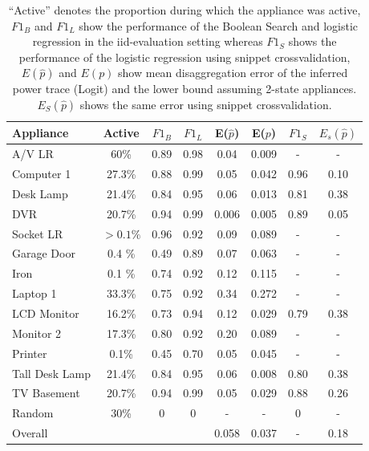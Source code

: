 \begin{table}[]
\setlength{\tabcolsep}{1pt}
\centering
\begin{tabular}{l|c|c|c|c|c || c | c}
\hline
Appliance      & Active            & $F1_{B}$ & $F1_{L}$ & E($\hat{p}$) & E($p$) & $F1_{S}$ & $E_s(\hat{p})$ \\ \hline
A/V LR         & 60\%              & 0.89        & 0.98       & 0.04      & 0.009  & - & -\\
Computer 1     & 27.3\%            & 0.88        & 0.99       & 0.05      & 0.042 & 0.96 & 0.10  \\
Desk Lamp      & 21.4\%            & 0.84        & 0.95       & 0.06      & 0.013 & 0.81 & 0.38  \\
DVR            & 20.7\%            & 0.94          & 0.99       & 0.006      & 0.005 & 0.89 & 0.05  \\
Socket LR      & $>0.1\%$ & 0.96        & 0.92       & 0.09      & 0.089 & - & -  \\
Garage Door    & 0.4 \%            & 0.49          & 0.89       & 0.07      & 0.063 & - & -  \\
Iron           & 0.1 \%            & 0.74        & 0.92       & 0.12      & 0.115 & - & -   \\
Laptop 1       & 33.3\%            & 0.75        & 0.92       & 0.34      & 0.272 & - & -  \\
LCD Monitor    & 16.2\%            & 0.73        & 0.94       & 0.12      & 0.029 & 0.79 & 0.38  \\
Monitor 2      & 17.3\%            & 0.80        & 0.92       & 0.20      & 0.089 & - & -   \\
Printer        & 0.1\%             & 0.45           & 0.70       & 0.05      & 0.045 & - & -  \\
Tall Desk Lamp & 21.4\%            & 0.84        & 0.95       & 0.06      & 0.008 & 0.80 & 0.38  \\
TV Basement    & 20.7\%            & 0.94        & 0.99       & 0.05      & 0.029 & 0.88 & 0.26 \\ \hline
Random         & 30\%              & 0           & 0          & -         & -    & 0  & -   \\ \hline \hline
Overall        &                   &             &            & 0.058      & 0.037 & - & 0.18
\end{tabular}
\caption[BOLT: Supervised performance comparison]{``Active'' denotes the proportion during which the appliance was active, $F1_{B}$ and $F1_{L}$ show the performance of the Boolean Search and logistic regression in the iid-evaluation setting whereas $F1_{S}$ shows the performance of the logistic regression using snippet crossvalidation, $E(\hat{p})$ and $E(p)$ show mean disaggregation error of the inferred power trace (Logit) and the lower bound assuming 2-state appliances. $E_S(\hat{p})$ shows the same error using snippet crossvalidation. }
\label{bolt:results}
\end{table}


